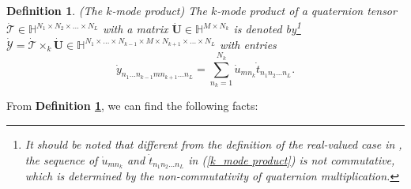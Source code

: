 \documentclass[journal]{IEEEtran}
\newtheorem{definition}{Definition}
\begin{document}
\begin{definition}
	\label{mode product}
	(The $k$-mode product) The $k$-mode product of a quaternion tensor $\dot{\mathcal{T}}\in\mathbb{H}^{N_{1}\times N_{2} \times\ldots \times N_{L}}$ with a matrix $\dot{\mathbf{U}}\in\mathbb{H}^{M\times N_{k}}$ is denoted by\footnote{It should be noted that different from the definition of the real-valued case in \cite{DBLP:journals/siamrev/KoldaB09}, the sequence of $\dot{u}_{mn_{k}}$ and $\dot{t}_{n_{1}n_{2}\ldots n_{L}}$ in (\ref{k_mode product}) is not commutative, which is determined by the non-commutativity of quaternion multiplication.}  $\dot{\mathcal{Y}}=\dot{\mathcal{T}}\times_{k}\dot{\mathbf{U}}\in\mathbb{H}^{N_{1}\times  \ldots \times N_{k-1} \times M \times N_{k+1}\times \ldots \times N_{L}}$ with entries
	\begin{equation}
	\label{k_mode product}
	\dot{y}_{n_{1}\ldots n_{k-1} m n_{k+1}\ldots  n_{L}}=\sum_{n_{k}=1}^{N_{k}}\dot{u}_{mn_{k}}\dot{t}_{n_{1}n_{2}\ldots n_{L}}.
	\end{equation}
\end{definition}
From \textbf{Definition \ref{mode product}}, we can find the following facts:
\end{document}
